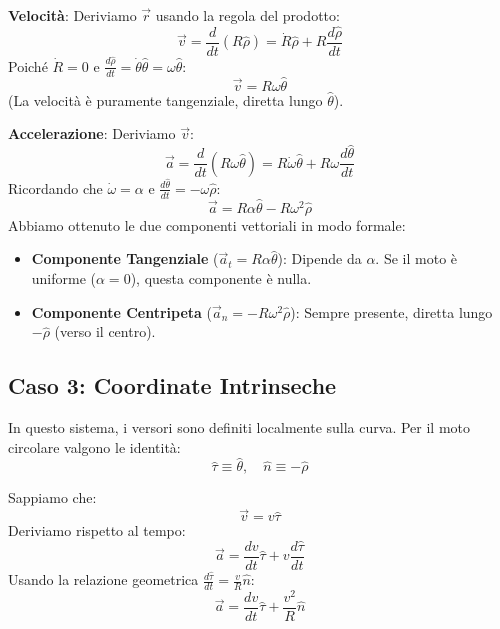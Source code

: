 \textbf{Velocità}: Deriviamo $\vec{r}$ usando la regola del prodotto:
\begin{equation}
    \vec{v} = \frac{d}{dt}(R \hat{\rho}) = \dot{R}\hat{\rho} + R\frac{d\hat{\rho}}{dt}
\end{equation}
Poiché $\dot{R}=0$ e $\frac{d\hat{\rho}}{dt} = \dot{\theta}\hat{\theta} = \omega \hat{\theta}$:
\begin{equation}
    \vec{v} = R\omega \hat{\theta}
\end{equation}
(La velocità è puramente tangenziale, diretta lungo $\hat{\theta}$).

\textbf{Accelerazione}: Deriviamo $\vec{v}$:
\begin{equation}
    \vec{a} = \frac{d}{dt}(R\omega \hat{\theta}) = R\dot{\omega}\hat{\theta} + R\omega\frac{d\hat{\theta}}{dt}
\end{equation}
Ricordando che $\dot{\omega} = \alpha$ e $\frac{d\hat{\theta}}{dt} = -\omega \hat{\rho}$:
\begin{equation}
    \vec{a} = R\alpha \hat{\theta} - R\omega^2 \hat{\rho}
\end{equation}
Abbiamo ottenuto le due componenti vettoriali in modo formale:
\begin{itemize}
    \item \textbf{Componente Tangenziale} ($\vec{a}_t = R\alpha \hat{\theta}$): Dipende da $\alpha$. Se il moto è uniforme ($\alpha=0$), questa componente è nulla.
    \item \textbf{Componente Centripeta} ($\vec{a}_n = -R\omega^2 \hat{\rho}$): Sempre presente, diretta lungo $-\hat{\rho}$ (verso il centro).
\end{itemize}

\subsection{Caso 3: Coordinate Intrinseche}
In questo sistema, i versori sono definiti localmente sulla curva. Per il moto circolare valgono le identità:
\begin{equation}
    \hat{\tau} \equiv \hat{\theta}, \quad \hat{n} \equiv -\hat{\rho}
\end{equation}

Sappiamo che:
\begin{equation}
    \vec{v} = v \hat{\tau}
\end{equation}
Deriviamo rispetto al tempo:
\begin{equation}
    \vec{a} = \frac{dv}{dt}\hat{\tau} + v\frac{d\hat{\tau}}{dt}
\end{equation}
Usando la relazione geometrica $\frac{d\hat{\tau}}{dt} = \frac{v}{R}\hat{n}$:
\begin{equation}
    \vec{a} = \frac{dv}{dt}\hat{\tau} + \frac{v^2}{R}\hat{n}
\end{equation}

